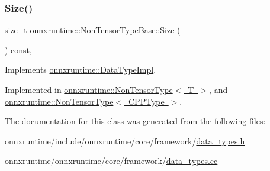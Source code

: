 \subsubsection{\texorpdfstring{Size()}{Size()}}
{\footnotesize\ttfamily \mbox{\hyperlink{mlasi_8h_a503efbc1c6e50825320ad909366b78ab}{size\+\_\+t}} onnxruntime\+::\+Non\+Tensor\+Type\+Base\+::\+Size (\begin{DoxyParamCaption}{ }\end{DoxyParamCaption}) const\hspace{0.3cm}{\ttfamily [override]}, {}}



Implements \mbox{\hyperlink{classonnxruntime_1_1DataTypeImpl_a025f1d860799cd7bc187482742ce7baa}{onnxruntime\+::\+Data\+Type\+Impl}}.



Implemented in \mbox{\hyperlink{classonnxruntime_1_1NonTensorType_a514c297618cdb975d4f98a5b47321086}{onnxruntime\+::\+Non\+Tensor\+Type$<$ T $>$}}, and \mbox{\hyperlink{classonnxruntime_1_1NonTensorType_a514c297618cdb975d4f98a5b47321086}{onnxruntime\+::\+Non\+Tensor\+Type$<$ C\+P\+P\+Type $>$}}.



The documentation for this class was generated from the following files\+:\begin{DoxyCompactItemize}
\item 
onnxruntime/include/onnxruntime/core/framework/\mbox{\hyperlink{data__types_8h}{data\+\_\+types.\+h}}\item 
onnxruntime/onnxruntime/core/framework/\mbox{\hyperlink{data__types_8cc}{data\+\_\+types.\+cc}}\end{DoxyCompactItemize}
